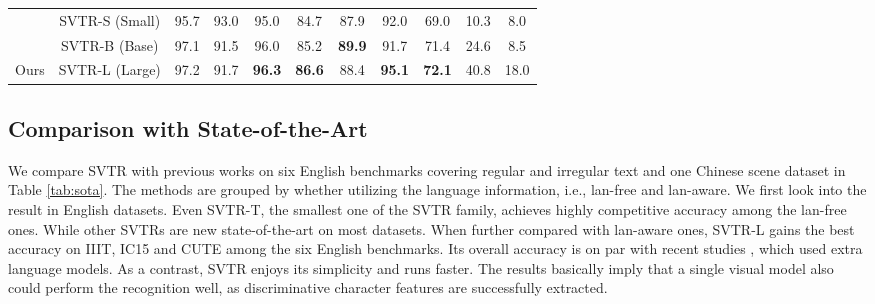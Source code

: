 \documentclass{article}
\begin{document}
\begin{table*}[ht]
{\begin{tabular}{c|r|ccc|ccc|c|cc}
\\
                                
                                & \multicolumn{1}{c|}{SVTR-S (Small)}     & 95.7                                & 93.0                                   & 95.0                                   & 84.7                                   & 87.9                                   & 92.0                                   & 69.0                                   & 10.3                                  & 8.0                       \\
                            & \multicolumn{1}{c|}{SVTR-B (Base)}     & 97.1                                 & 91.5                                 & 96.0                                   & 85.2                            &\textbf{89.9}                               & 91.7                                 & 71.4                                   & 24.6                    &     8.5                     \\
\multirow{-4}{*}{Ours}          

                            & \multicolumn{1}{c|}{SVTR-L (Large)}     & {97.2}                           & 91.7                                 &  \textbf{96.3} & \textbf{86.6} & 88.4                                 & \textbf{95.1} & {\textbf{72.1}} & 40.8                    & 18.0                      \\
\bottomrule
\end{tabular}}
\caption{Results on six English and one Chinese benchmarks tested against existing methods, where $CRNN$ and $Rosetta$ are from the reproduction of CombBest \protect\cite{Baek2019WhatIW}. $Lan$ means language and * means the language-free version of the corresponding method. The speed is the inference time on one NVIDIA 1080Ti GPU averaged over 3000 English image text.}
\label{tab:sota}
\end{table*}


\subsection{Comparison with State-of-the-Art}



We compare SVTR with previous works on six English benchmarks covering regular and irregular text and one Chinese scene dataset in Table \ref{tab:sota}. The methods are grouped by whether utilizing the language information, i.e., lan-free and lan-aware. We first look into the result in English datasets. Even SVTR-T, the smallest one of the SVTR family, achieves highly competitive accuracy among the lan-free ones. While other SVTRs are new state-of-the-art on most datasets. When further compared with lan-aware ones, SVTR-L gains the best accuracy on IIIT, IC15 and CUTE among the six English benchmarks. Its overall accuracy is on par with recent studies \cite{fang2021abinet,tang2021vst}, which used extra language models. As a contrast, SVTR enjoys its simplicity and runs faster. The results basically imply that a single visual model also could perform the recognition well, as discriminative character features are successfully extracted.
\end{document}
